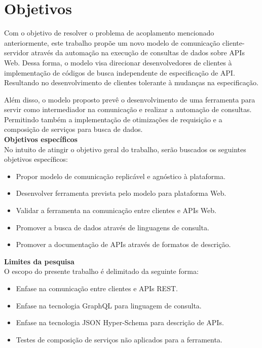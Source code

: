 \section[Objetivos]{Objetivos}

Com o objetivo de resolver o problema de acoplamento mencionado anteriormente, este trabalho propõe um novo modelo de comunicação cliente-servidor através da automação na execução de consultas de dados sobre APIs Web. Dessa forma, o modelo visa direcionar desenvolvedores de clientes à implementação de códigos de busca independente de especificação de API. Resultando no desenvolvimento de clientes tolerante à mudanças na especificação.

Além disso, o modelo proposto prevê o desenvolvimento de uma ferramenta para servir como intermediador na comunicação e realizar a automação de consultas. Permitindo também a implementação de otimizações de requisição e a composição de serviços para busca de dados. \\

\textbf{Objetivos específicos} \\

No intuito de atingir o objetivo geral do trabalho, serão buscados os seguintes objetivos específicos:

\begin{itemize}
\item Propor modelo de comunicação replicável e agnóstico à plataforma.
\item Desenvolver ferramenta prevista pelo modelo para plataforma Web.
\item Validar a ferramenta na comunicação entre clientes e APIs Web.
\item Promover a busca de dados através de linguagens de consulta.
\item Promover a documentação de APIs através de formatos de descrição. \\
\end{itemize}

\textbf{Limites da pesquisa} \\

O escopo do presente trabalho é delimitado da seguinte forma:

\begin{itemize}
\item Enfase na comunicação entre clientes e APIs REST.
\item Enfase na tecnologia GraphQL para linguagem de consulta.
\item Enfase na tecnologia JSON Hyper-Schema para descrição de APIs.
\item Testes de composição de serviços não aplicados para a ferramenta.
\end{itemize}
